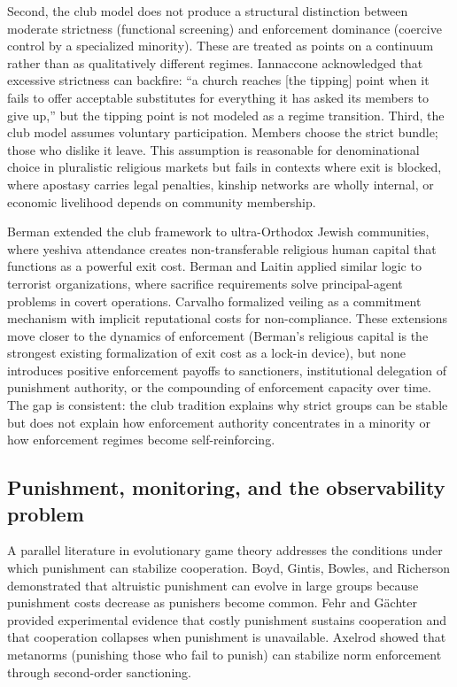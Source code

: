 \documentclass[12pt]{article}
\begin{document}
Second, the club model does not produce a structural distinction between moderate strictness (functional screening) and enforcement dominance (coercive control by a specialized minority). These are treated as points on a continuum rather than as qualitatively different regimes. Iannaccone \cite{iannaccone1994} acknowledged that excessive strictness can backfire: ``a church reaches [the tipping] point when it fails to offer acceptable substitutes for everything it has asked its members to give up,'' but the tipping point is not modeled as a regime transition. Third, the club model assumes voluntary participation. Members choose the strict bundle; those who dislike it leave. This assumption is reasonable for denominational choice in pluralistic religious markets but fails in contexts where exit is blocked, where apostasy carries legal penalties, kinship networks are wholly internal, or economic livelihood depends on community membership.

Berman \cite{berman2000} extended the club framework to ultra-Orthodox Jewish communities, where yeshiva attendance creates non-transferable religious human capital that functions as a powerful exit cost. Berman and Laitin \cite{berman2008} applied similar logic to terrorist organizations, where sacrifice requirements solve principal-agent problems in covert operations. Carvalho \cite{carvalho2013} formalized veiling as a commitment mechanism with implicit reputational costs for non-compliance. These extensions move closer to the dynamics of enforcement (Berman's religious capital is the strongest existing formalization of exit cost as a lock-in device), but none introduces positive enforcement payoffs to sanctioners, institutional delegation of punishment authority, or the compounding of enforcement capacity over time. The gap is consistent: the club tradition explains why strict groups can be stable but does not explain how enforcement authority concentrates in a minority or how enforcement regimes become self-reinforcing.

\subsection{Punishment, monitoring, and the observability problem}

A parallel literature in evolutionary game theory addresses the conditions under which punishment can stabilize cooperation. Boyd, Gintis, Bowles, and Richerson \cite{boyd2003} demonstrated that altruistic punishment can evolve in large groups because punishment costs decrease as punishers become common. Fehr and G\"{a}chter \cite{fehr2000,fehr2002} provided experimental evidence that costly punishment sustains cooperation and that cooperation collapses when punishment is unavailable. Axelrod \cite{axelrod1986} showed that metanorms (punishing those who fail to punish) can stabilize norm enforcement through second-order sanctioning.
\end{document}
